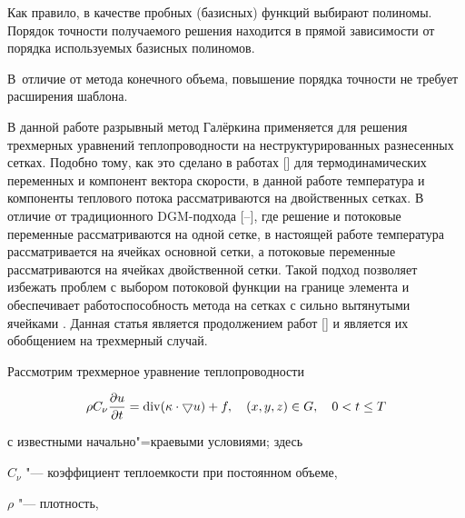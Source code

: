 Как правило, в качестве пробных (базисных) функций выбирают полиномы. Порядок точности получаемого решения находится в прямой зависимости от порядка используемых базисных полиномов. 

В~отличие от метода конечного объема, повышение порядка точности не требует расширения шаблона.



В данной работе разрывный метод Галёркина применяется для решения трехмерных уравнений теплопроводности на неструктурированных разнесенных сетках. Подобно тому, как это сделано в работах [] для термодинамических переменных и компонент вектора скорости, в данной работе температура и компоненты теплового потока рассматриваются на двойственных сетках. В отличие от традиционного DGM-подхода [--], где решение и потоковые переменные рассматриваются на одной сетке, в настоящей работе температура рассматривается на ячейках основной сетки, а потоковые переменные рассматриваются на ячейках двойственной сетки. Такой подход позволяет избежать проблем с выбором потоковой функции на границе элемента и обеспечивает работоспособность метода на сетках с сильно вытянутыми ячейками \cite{Masyagin:bib:MasyaginPanyushkina}. Данная статья является продолжением работ [] и является их обобщением на трехмерный случай.





\smallskip




Рассмотрим трехмерное уравнение теплопроводности

\begin{equation}

\rho C_\nu \frac{\partial u}{\partial t}=\mathop{\rm div}(\kappa \cdot \bigtriangledown u) + f, \quad \left(x,y,z\right) \in G, \quad 0<t \le T \label{eq:mas:HeatConduction}

\end{equation}

с известными начально"=краевыми условиями; здесь

$C_\nu$ "--- коэффициент теплоемкости при постоянном объеме, 

$\rho$ "--- плотность, 

